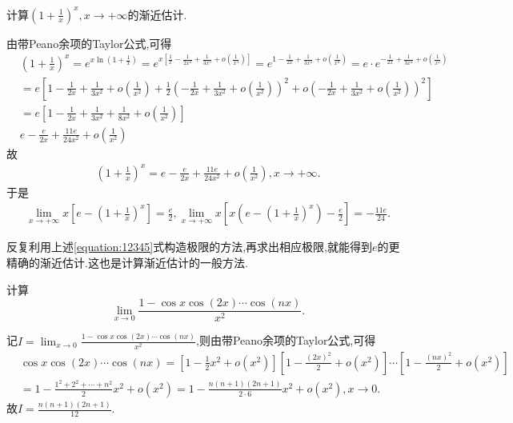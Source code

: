 \documentclass[../../main.tex]{subfiles}%
\begin{document}
\begin{example}
计算$(1+\frac{1}{x})^x,x\to+\infty$的渐近估计.
\end{example}
\begin{solution}
由带Peano余项的Taylor公式,可得
\begin{align*}
&\left( 1+\frac{1}{x} \right) ^x=e^{x\ln \left( 1+\frac{1}{x} \right)}=e^{x\left[ \frac{1}{x}-\frac{1}{2x^2}+\frac{1}{3x^3}+o\left( \frac{1}{x^3} \right) \right]}=e^{1-\frac{1}{2x}+\frac{1}{3x^2}+o\left( \frac{1}{x^2} \right)}=e\cdot e^{-\frac{1}{2x}+\frac{1}{3x^2}+o\left( \frac{1}{x^2} \right)}
\\
&=e\left[ 1-\frac{1}{2x}+\frac{1}{3x^2}+o\left( \frac{1}{x^2} \right) +\frac{1}{2}\left( -\frac{1}{2x}+\frac{1}{3x^2}+o\left( \frac{1}{x^2} \right) \right) ^2+o\left( -\frac{1}{2x}+\frac{1}{3x^2}+o\left( \frac{1}{x^2} \right) \right) ^2 \right] 
\\
&=e\left[ 1-\frac{1}{2x}+\frac{1}{3x^2}+\frac{1}{8x^2}+o\left( \frac{1}{x^2} \right) \right] 
\\
&e-\frac{e}{2x}+\frac{11e}{24x^2}+o\left( \frac{1}{x^2} \right) 
\end{align*}
故\begin{align*}
\left( 1+\frac{1}{x} \right) ^x=e-\frac{e}{2x}+\frac{11e}{24x^2}+o\left( \frac{1}{x^2} \right) ,x\rightarrow +\infty .
\end{align*}
于是
\begin{align}\label{equation:12345}
\underset{x\rightarrow +\infty}{\lim}x\left[ e-\left( 1+\frac{1}{x} \right) ^x \right] =\frac{e}{2},\underset{x\rightarrow +\infty}{\lim}x\left[ x\left( e-\left( 1+\frac{1}{x} \right) ^x \right) -\frac{e}{2} \right] =-\frac{11e}{24}.
\end{align}

\end{solution}
\begin{remark}
反复利用上述\eqref{equation:12345}式构造极限的方法,再求出相应极限,就能得到$e$的更精确的渐近估计.这也是计算渐近估计的一般方法.
\end{remark}

\begin{example}
计算
\[
\lim_{x \to 0} \frac{1 - \cos x \cos(2x) \cdots \cos(nx)}{x^2}.
\]
\end{example}
\begin{solution}
记$I=\lim_{x \to 0} \frac{1 - \cos x \cos(2x) \cdots \cos(nx)}{x^2}$,则由带Peano余项的Taylor公式,可得
\begin{align*}
&\cos x \cos(2x) \cdots \cos(nx)
=\left[1 - \frac{1}{2}x^2 + o(x^2)\right]\left[1 - \frac{(2x)^2}{2} + o(x^2)\right] \cdots \left[1 - \frac{(nx)^2}{2} + o(x^2)\right]
\\
&= 1 - \frac{1^2 + 2^2 + \cdots + n^2}{2}x^2 + o(x^2)
= 1 - \frac{n(n + 1)(2n + 1)}{2 \cdot 6}x^2 + o(x^2),x\to0.
\end{align*}
故\(I = \frac{n(n + 1)(2n + 1)}{12}\).

\end{solution}
\end{document}
